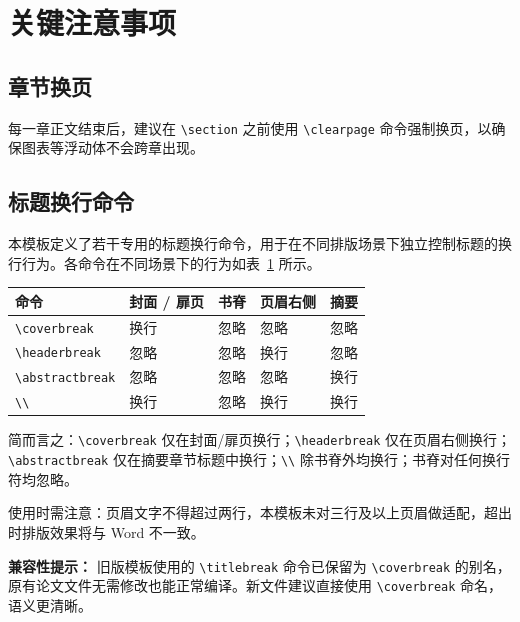 \clearpage
\section{关键注意事项}

\subsection{章节换页}

每一章正文结束后，建议在 \verb|\section| 之前使用 \verb|\clearpage| 命令强制换页，以确保图表等浮动体不会跨章出现。

\subsection{标题换行命令}

本模板定义了若干专用的标题换行命令，用于在不同排版场景下独立控制标题的换行行为。各命令在不同场景下的行为如表~\ref{tab:titlebreak} 所示。

\begin{table}[H]
    \centering
    \label{tab:titlebreak}
    \begin{tabular}{@{}lllll@{}}
        \toprule
        命令 & 封面 / 扉页 & 书脊 & 页眉右侧 & 摘要 \\ \midrule
        \verb|\coverbreak|    & 换行 & 忽略 & 忽略 & 忽略 \\
        \verb|\headerbreak|   & 忽略 & 忽略 & 换行 & 忽略 \\
        \verb|\abstractbreak| & 忽略 & 忽略 & 忽略 & 换行 \\
        \verb|\\|             & 换行 & 忽略 & 换行 & 换行 \\ \bottomrule
    \end{tabular}
\end{table}

简而言之：\verb|\coverbreak| 仅在封面/扉页换行；\verb|\headerbreak| 仅在页眉右侧换行；\verb|\abstractbreak| 仅在摘要章节标题中换行；\verb|\\| 除书脊外均换行；书脊对任何换行符均忽略。

使用时需注意：页眉文字不得超过两行，本模板未对三行及以上页眉做适配，超出时排版效果将与 Word 不一致。

\textbf{兼容性提示：} 旧版模板使用的 \verb|\titlebreak| 命令已保留为 \verb|\coverbreak| 的别名，原有论文文件无需修改也能正常编译。新文件建议直接使用 \verb|\coverbreak| 命名，语义更清晰。
